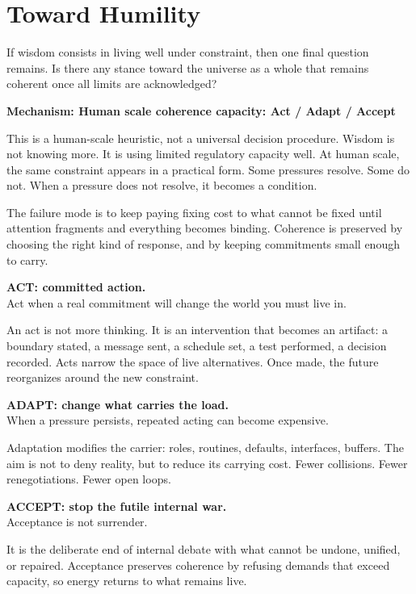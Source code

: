 \documentclass[11pt,twoside,openright]{book}
\newenvironment{mechanismbox}[1]
  {\begin{framed}\noindent\textbf{Mechanism: #1}\par\medskip}
  {\end{framed}}
\begin{document}
\section*{Toward Humility}

If wisdom consists in living well under constraint, then one final question remains. Is there any stance toward the universe as a whole that remains coherent once all limits are acknowledged?

\begin{mechanismbox}{Human scale coherence capacity: Act / Adapt / Accept}

This is a human-scale heuristic, not a universal decision procedure. Wisdom is not knowing more. It is using limited regulatory capacity well. At human scale, the same constraint appears in a practical form. Some pressures resolve. Some do not. When a pressure does not resolve, it becomes a condition.

The failure mode is to keep paying fixing cost to what cannot be fixed until attention fragments and everything becomes binding. Coherence is preserved by choosing the right kind of response, and by keeping commitments small enough to carry.

\medskip
\noindent\textbf{ACT: committed action.}\\
Act when a real commitment will change the world you must live in.

An act is not more thinking. It is an intervention that becomes an artifact: a boundary stated, a message sent, a schedule set, a test performed, a decision recorded. Acts narrow the space of live alternatives. Once made, the future reorganizes around the new constraint.

\medskip
\noindent\textbf{ADAPT: change what carries the load.}\\
When a pressure persists, repeated acting can become expensive.

Adaptation modifies the carrier: roles, routines, defaults, interfaces, buffers. The aim is not to deny reality, but to reduce its carrying cost. Fewer collisions. Fewer renegotiations. Fewer open loops.

\medskip
\noindent\textbf{ACCEPT: stop the futile internal war.}\\
Acceptance is not surrender.

It is the deliberate end of internal debate with what cannot be undone, unified, or repaired. Acceptance preserves coherence by refusing demands that exceed capacity, so energy returns to what remains live.


\end{mechanismbox}
\end{document}
